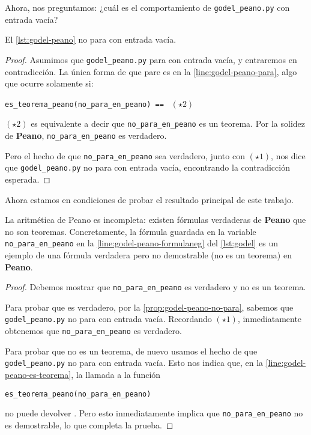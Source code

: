 Ahora, nos preguntamos: ¿cuál es el comportamiento de \texttt{godel\_peano.py} con entrada vacía?

\begin{proposicion}\label{prop:godel-peano-no-para}
El \cref{lst:godel-peano} no para con entrada vacía.
\end{proposicion}
\begin{proof}
Asumimos que \texttt{godel\_peano.py} para con entrada vacía, y entraremos en contradicción. La única forma de que pare es en la \cref{line:godel-peano-para}, algo que ocurre solamente si:
\begin{adjustwidth}{30pt}{}
    \texttt{es\_teorema\_peano(no\_para\_en\_peano) == } \hfill $(\star2)$
\end{adjustwidth}
$(\star2)$ es equivalente a decir que \texttt{no\_para\_en\_peano} es un teorema. Por la solidez de \textbf{Peano}, \texttt{no\_para\_en\_peano} es verdadero.

Pero el hecho de que \texttt{no\_para\_en\_peano} sea verdadero, junto con $(\star1)$, nos dice que \linebreak\texttt{godel\_peano.py} no para con entrada vacía, encontrando la contradicción esperada.
\end{proof}

Ahora estamos en condiciones de probar el resultado principal de este trabajo.

\begin{teorema}\label{teo:incompletitud-peano}
La aritmética de Peano es incompleta: existen fórmulas verdaderas de {\normalfont \textbf{Peano}} que no son teoremas. Concretamente, la fórmula guardada en la variable {\normalfont \texttt{no\_para\_en\_peano}} en la \cref{line:godel-peano-formulaneg} del \cref{lst:godel} es un ejemplo de una fórmula verdadera pero no demostrable (no es un teorema) en {\normalfont \textbf{Peano}}.
\end{teorema}
\begin{proof}
Debemos mostrar que \texttt{no\_para\_en\_peano} es verdadero y no es un teorema.

Para probar que es verdadero, por la \cref{prop:godel-peano-no-para}, sabemos que \texttt{godel\_peano.py} no para con entrada vacía. Recordando $(\star1)$, inmediatamente obtenemos que \texttt{no\_para\_en\_peano} es verdadero.

Para probar que no es un teorema, de nuevo usamos el hecho de que \texttt{godel\_peano.py} no para con entrada vacía. Esto nos indica que, en la \cref{line:godel-peano-es-teorema}, la llamada a la función
\begin{adjustwidth}{30pt}{}
    \texttt{es\_teorema\_peano(no\_para\_en\_peano)}
\end{adjustwidth}
no puede devolver . Pero esto inmediatamente implica que \texttt{no\_para\_en\_peano} no es demostrable, lo que completa la prueba.
\end{proof}

